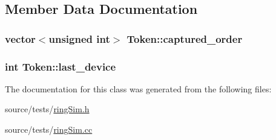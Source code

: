 \subsection{Member Data Documentation}
\hypertarget{classToken_aa5b37a82f9324d5d346cc03f15a6ad7}{
\subsubsection[{captured\_\-order}]{\setlength{\rightskip}{0pt plus 5cm}vector$<$unsigned int$>$ {\bf Token::captured\_\-order}}}
\label{classToken_aa5b37a82f9324d5d346cc03f15a6ad7}


\hypertarget{classToken_2946e24204e9e41f07e25cc737c9e5ee}{
\subsubsection[{last\_\-device}]{\setlength{\rightskip}{0pt plus 5cm}int {\bf Token::last\_\-device}}}
\label{classToken_2946e24204e9e41f07e25cc737c9e5ee}




The documentation for this class was generated from the following files:\begin{CompactItemize}
\item 
source/tests/\hyperlink{ringSim_8h}{ringSim.h}\item 
source/tests/\hyperlink{ringSim_8cc}{ringSim.cc}\end{CompactItemize}
